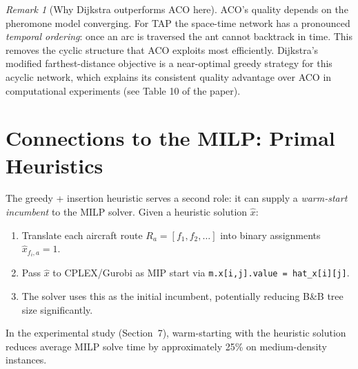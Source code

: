 \documentclass[11pt, a4paper]{article}
\theoremstyle{plain}
\theoremstyle{definition}
\theoremstyle{remark}
\newtheorem{remark}{Remark}
\begin{document}
\begin{remark}[Why Dijkstra outperforms ACO here]
  ACO's quality depends on the pheromone model converging.  For TAP the
  space-time network has a pronounced \emph{temporal ordering}: once an arc is
  traversed the ant cannot backtrack in time.  This removes the cyclic structure
  that ACO exploits most efficiently.  Dijkstra's modified farthest-distance
  objective is a near-optimal greedy strategy for this acyclic network, which
  explains its consistent quality advantage over ACO in computational experiments
  (see Table 10 of the paper).
\end{remark}

\section{Connections to the MILP: Primal Heuristics}

The greedy + insertion heuristic serves a second role: it can supply a
\emph{warm-start incumbent} to the MILP solver.  Given a heuristic solution
$\hat{x}$:
\begin{enumerate}[label=(\arabic*)]
  \item Translate each aircraft route $R_a = [f_1, f_2, \ldots]$ into binary
    assignments $\hat{x}_{f_i, a} = 1$.
  \item Pass $\hat{x}$ to CPLEX/Gurobi as MIP start via
    \texttt{m.x[i,j].value = hat\_x[i][j]}.
  \item The solver uses this as the initial incumbent, potentially reducing
    B\&B tree size significantly.
\end{enumerate}

In the experimental study (Section~7), warm-starting with the heuristic
solution reduces average MILP solve time by approximately 25\% on
medium-density instances.
\end{document}
